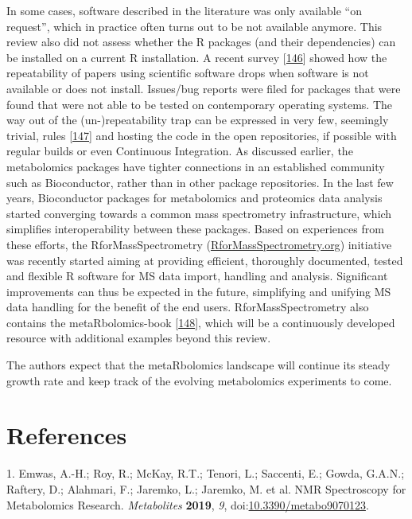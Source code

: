 \documentclass[]{article}
\begin{document}
In some cases, software described in the literature was only available ``on request'', which in practice often turns out to be not available anymore. This review also did not assess whether the R packages (and their dependencies) can be installed on a current R installation. A recent survey {[}\protect\hyperlink{ref-collberg_2016}{146}{]} showed how the repeatability of papers using scientific software drops when software is not available or does not install. Issues/bug reports were filed for packages that were found that were not able to be tested on contemporary operating systems. The way out of the (un-)repeatability trap can be expressed in very few, seemingly trivial, rules {[}\protect\hyperlink{ref-taschuk_2017}{147}{]} and hosting the code in the open repositories, if possible with regular builds or even Continuous Integration. As discussed earlier, the metabolomics packages have tighter connections in an established community such as Bioconductor, rather than in other package repositories. In the last few years, Bioconductor packages for metabolomics and proteomics data analysis started converging towards a common mass spectrometry infrastructure, which simplifies interoperability between these packages. Based on experiences from these efforts, the RforMassSpectrometry (\href{https://rformassspectrometry.org}{RforMassSpectrometry.org}) initiative was recently started aiming at providing efficient, thoroughly documented, tested and flexible R software for MS data import, handling and analysis. Significant improvements can thus be expected in the future, simplifying and unifying MS data handling for the benefit of the end users. RforMassSpectrometry also contains the metaRbolomics-book {[}\protect\hyperlink{ref-stanstrup_website_nd}{148}{]}, which will be a continuously developed resource with additional examples beyond this review.

The authors expect that the metaRbolomics landscape will continue its steady growth rate and keep track of the evolving metabolomics experiments to come.

\newpage

\hypertarget{references}{%
\section*{References}\label{references}}

\hypertarget{refs}{}
\leavevmode\hypertarget{ref-emwas_2019}{}%
1. Emwas, A.-H.; Roy, R.; McKay, R.T.; Tenori, L.; Saccenti, E.; Gowda, G.A.N.; Raftery, D.; Alahmari, F.; Jaremko, L.; Jaremko, M. et al. NMR Spectroscopy for Metabolomics Research. \emph{Metabolites} \textbf{2019}, \emph{9}, doi:\href{https://doi.org/10.3390/metabo9070123}{10.3390/metabo9070123}.
\end{document}
